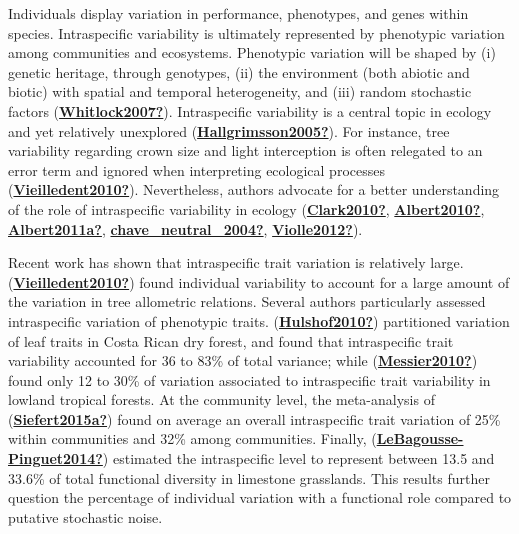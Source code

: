 \documentclass[12pt,twoside,a4paper, a]{article}
\begin{document}
Individuals display variation in performance, phenotypes, and genes within species.
Intraspecific variability is ultimately represented by phenotypic variation among communities and ecosystems.
Phenotypic variation will be shaped by (i) genetic heritage, through genotypes, (ii) the environment (both abiotic and biotic) with spatial and temporal heterogeneity, and (iii) random stochastic factors (\protect\hyperlink{ref-Whitlock2007}{\textbf{Whitlock2007?}}).
Intraspecific variability is a central topic in ecology and yet relatively unexplored (\protect\hyperlink{ref-Hallgrimsson2005}{\textbf{Hallgrimsson2005?}}).
For instance, tree variability regarding crown size and light interception is often relegated to an error term and ignored when interpreting ecological processes (\protect\hyperlink{ref-Vieilledent2010}{\textbf{Vieilledent2010?}}).
Nevertheless, authors advocate for a better understanding of the role of intraspecific variability in ecology (\protect\hyperlink{ref-Clark2010}{\textbf{Clark2010?}}, \protect\hyperlink{ref-Albert2010}{\textbf{Albert2010?}}, \protect\hyperlink{ref-Albert2011a}{\textbf{Albert2011a?}}, \protect\hyperlink{ref-chave_neutral_2004}{\textbf{chave\_neutral\_2004?}}, \protect\hyperlink{ref-Violle2012}{\textbf{Violle2012?}}).

Recent work has shown that intraspecific trait variation is relatively large.
(\protect\hyperlink{ref-Vieilledent2010}{\textbf{Vieilledent2010?}}) found individual variability to account for a large amount of the variation in tree allometric relations.
Several authors particularly assessed intraspecific variation of phenotypic traits.
(\protect\hyperlink{ref-Hulshof2010}{\textbf{Hulshof2010?}}) partitioned variation of leaf traits in Costa Rican dry forest, and found that intraspecific trait variability accounted for 36 to 83\% of total variance;
while (\protect\hyperlink{ref-Messier2010}{\textbf{Messier2010?}}) found only 12 to 30\% of variation associated to intraspecific trait variability in lowland tropical forests.
At the community level, the meta-analysis of (\protect\hyperlink{ref-Siefert2015a}{\textbf{Siefert2015a?}}) found on average an overall intraspecific trait variation of 25\% within communities and 32\% among communities.
Finally, (\protect\hyperlink{ref-LeBagousse-Pinguet2014}{\textbf{LeBagousse-Pinguet2014?}}) estimated the intraspecific level to represent between 13.5 and 33.6\% of total functional diversity in limestone grasslands.
This results further question the percentage of individual variation with a functional role compared to putative stochastic noise.
\end{document}
